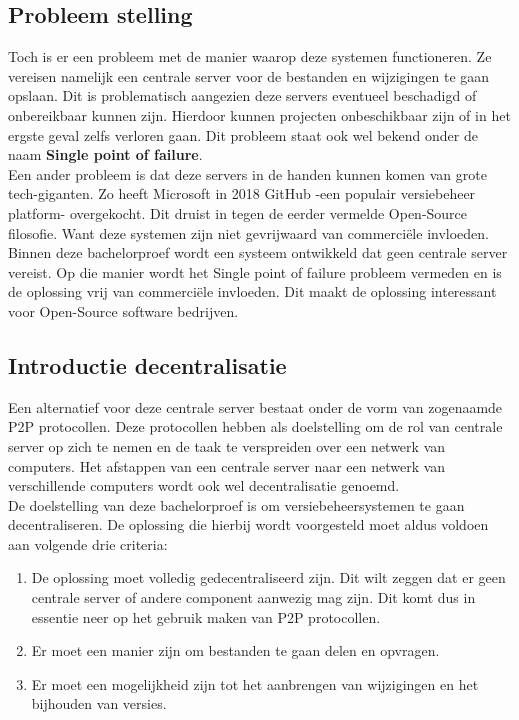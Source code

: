 \subsection{Probleem stelling}
Toch is er een probleem met de manier waarop deze systemen functioneren. Ze vereisen namelijk een centrale server voor de bestanden en wijzigingen te gaan opslaan. Dit is problematisch aangezien deze servers eventueel beschadigd of onbereikbaar kunnen zijn. Hierdoor kunnen projecten onbeschikbaar zijn of in het ergste geval zelfs verloren gaan. Dit probleem staat ook wel bekend onder de naam \textbf{Single point of failure}.\\

Een ander probleem is dat deze servers in de handen kunnen komen van grote tech-giganten. Zo heeft Microsoft in 2018 GitHub -een populair versiebeheer platform- overgekocht. Dit druist in tegen de eerder vermelde Open-Source filosofie. Want deze systemen zijn niet gevrijwaard van commerciële invloeden.\\

Binnen deze bachelorproef wordt een systeem ontwikkeld dat geen centrale server vereist. Op die manier wordt het Single point of failure probleem vermeden en is de oplossing vrij van commerciële invloeden. Dit maakt de oplossing interessant voor Open-Source software bedrijven.
\subsection{Introductie decentralisatie}
Een alternatief voor deze centrale server bestaat onder de vorm van zogenaamde P2P protocollen. Deze protocollen hebben als doelstelling om de rol van centrale server op zich te nemen en de taak te verspreiden over een netwerk van computers. Het afstappen van een centrale server naar een netwerk van verschillende computers wordt ook wel decentralisatie genoemd.\\

De doelstelling van deze bachelorproef is om versiebeheersystemen te gaan decentraliseren. De oplossing die hierbij wordt voorgesteld moet aldus voldoen aan volgende drie criteria:

\begin{enumerate}
 \item De oplossing moet volledig gedecentraliseerd zijn. Dit wilt zeggen dat er geen centrale server of andere component aanwezig mag zijn. Dit komt dus in essentie neer op het gebruik maken van P2P protocollen.\\
 \item Er moet een manier zijn om bestanden te gaan delen en opvragen.\\
 \item Er moet een mogelijkheid zijn tot het aanbrengen van wijzigingen en het bijhouden van versies.
\end{enumerate}

